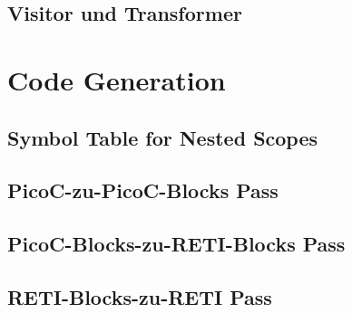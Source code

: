 \subsection{Visitor und Transformer}
\section{Code Generation}
\subsection{Symbol Table for Nested Scopes}
\subsection{PicoC-zu-PicoC-Blocks Pass}
\subsection{PicoC-Blocks-zu-RETI-Blocks Pass}
\subsection{RETI-Blocks-zu-RETI Pass}
